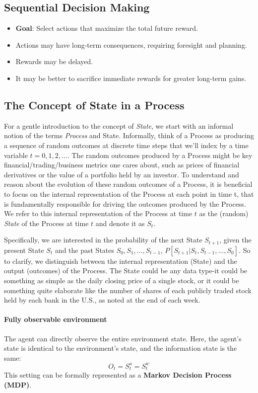 \subsection{Sequential Decision Making}
\begin{itemize}
    \item \textbf{Goal}: Select actions that maximize the total future reward.
    \item Actions may have long-term consequences, requiring foresight and planning.
    \item Rewards may be delayed.
    \item It may be better to sacrifice immediate rewards for greater long-term gains.
\end{itemize}

\subsection{The Concept of State in a Process}
For a gentle introduction to the concept of \textit{State}, we start with an informal notion of the terms \textit{Process} and State. Informally, think of a Process as producing a sequence of random outcomes at discrete time steps that we’ll index by a time variable $t = 0, 1, 2, \dots$. The random outcomes produced by a Process might be key financial/trading/business metrics one cares about, such as prices of financial derivatives or the value of a portfolio held by an investor. To understand and reason about the evolution of these random outcomes of a Process, it is beneficial to focus on the internal representation of the Process at each point in time t, that is fundamentally responsible for driving the outcomes produced by the Process. We refer to this internal representation of the Process at time $t$ as the (random) \textit{State} of the Process at time $t$ and denote it as $S_t$.

Specifically, we are interested in the probability of the next State $S_{t+1}$, given the present State $S_t$ and the past States $S_0, S_1, \dots, S_{t-1}$, \ie $P[S_{t+1}|S_t, S_{t-1},\dots, S_0]$. So to clarify, we distinguish between the internal representation (State) and the output (outcomes) of the Process. The State could be any data type-it could be something as simple as the daily closing price of a single stock, or it could be something quite elaborate like the number of shares of each publicly traded stock held by each bank in the U.S., as noted at the end of each week.

\paragraph{Fully observable environment} The agent can directly observe the entire environment state. Here, the agent’s state is identical to the environment's state, and the information state is the same:
$$O_t=S_t^a=S_t^w$$
This setting can be formally represented as a \textbf{Markov Decision Process (MDP)}.

